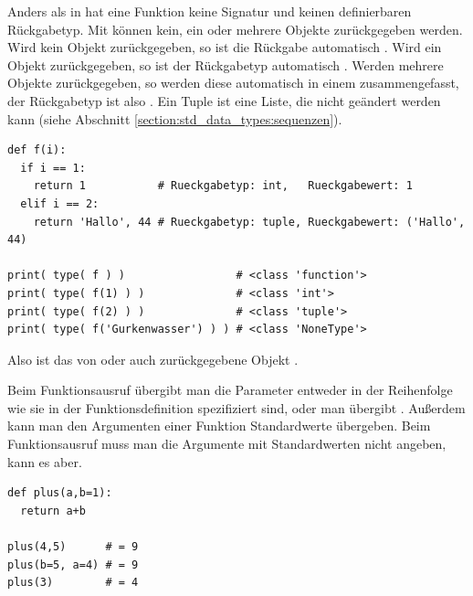 Anders als in \CC hat eine Funktion keine Signatur und keinen definierbaren Rückgabetyp.
Mit  können kein, ein oder mehrere Objekte zurückgegeben werden.
Wird kein Objekt zurückgegeben, so ist die Rückgabe automatisch .
Wird ein Objekt  zurückgegeben, so ist der Rückgabetyp automatisch .
Werden mehrere Objekte zurückgegeben, so werden diese automatisch in einem  zusammengefasst, der Rückgabetyp ist also .
Ein Tuple ist eine Liste, die nicht geändert werden kann (siehe Abschnitt \ref{section:std_data_types:sequenzen}).
\begin{lstlisting}
def f(i):
  if i == 1:
    return 1           # Rueckgabetyp: int,   Rueckgabewert: 1
  elif i == 2:
    return 'Hallo', 44 # Rueckgabetyp: tuple, Rueckgabewert: ('Hallo', 44)

print( type( f ) )                 # <class 'function'>
print( type( f(1) ) )              # <class 'int'>
print( type( f(2) ) )              # <class 'tuple'>
print( type( f('Gurkenwasser') ) ) # <class 'NoneType'>
\end{lstlisting}
Also ist das von  oder auch  zurückgegebene Objekt .

Beim Funktionsausruf übergibt man die Parameter entweder in der Reihenfolge wie sie in der Funktionsdefinition spezifiziert sind, oder man übergibt .
Außerdem kann man den Argumenten einer Funktion Standardwerte übergeben.
Beim Funktionsausruf muss man die Argumente mit Standardwerten nicht angeben, kann es aber.
\begin{lstlisting}
def plus(a,b=1):
  return a+b

plus(4,5)      # = 9
plus(b=5, a=4) # = 9
plus(3)        # = 4
\end{lstlisting}


